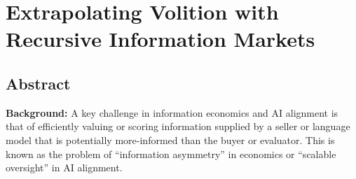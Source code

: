 \chapter{Extrapolating Volition with Recursive Information Markets}
\label{chap:recursive-information-markets}


\providecommand{\Nats}{\mathbb{N}}
\providecommand{\Ints}{\mathbb{Z}}
\NewDocumentCommand{\Samples}{}{\Omega}
\providecommand{\Struct}[1]{\State \textbf{class} \textsc{#1}}
\providecommand{\EndStruct}{\State \textbf{end class}}
\providecommand{\bleg}[1]{}

\section*{Abstract}

\noindent\textbf{Background:} A key challenge in information economics and AI alignment is that of efficiently valuing or scoring information supplied by a seller or language model that is potentially more-informed than the buyer or evaluator. This is known as the problem of ``information asymmetry'' in economics or ``scalable oversight'' in AI alignment.

